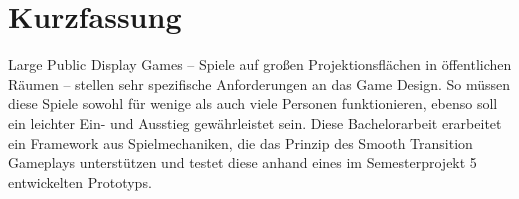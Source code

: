 \chapter{Kurzfassung}

Large Public Display Games -- Spiele auf großen Projektionsflächen in öffentlichen Räumen -- stellen sehr spezifische Anforderungen an das Game Design. So müssen diese Spiele sowohl für wenige als auch viele Personen funktionieren, ebenso soll ein leichter Ein- und Ausstieg gewährleistet sein. Diese Bachelorarbeit erarbeitet ein Framework aus Spielmechaniken, die das Prinzip des Smooth Transition Gameplays unterstützen und testet diese anhand eines im Semesterprojekt 5 entwickelten Prototyps.
